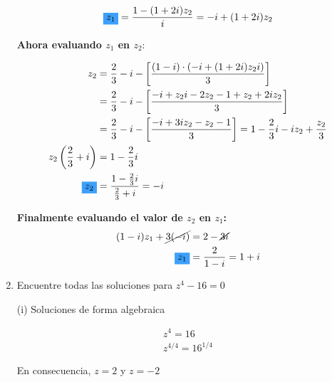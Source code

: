 \documentclass[a4paper,12pt]{article}
\begin{document}
\begin{enumerate}
            \begin{equation*}
                \colorbox{blueMacc}{$z_{1}$}=\frac{1-(1+2 i) z_{2}}{i}=-i+(1+2 i) z_{2}
            \end{equation*}

            \begin{center}
                \textbf{Ahora evaluando $z_{1}$ en $z_{2}$}:             
            \end{center}

            \begin{align*}
                z_{2} &=\frac{2}{3}-i-\left[\frac{(1-i) \cdot\left(-i+(1+2 i) z_{2} i\right)}{3}\right] \\
                &=\frac{2}{3}-i-\left[\frac{-i+z_{2} i-2 z_{2}-1+z_{2}+2 i z_{2}}{3}\right] \\
                &=\frac{2}{3}-i-\left[\frac{-i+3 i z_{2}-z_{2}-1}{3}\right]=1-\frac{2}{3} i-i z_{2}+\frac{z_{2}}{3}\\
                z_{2}\left(\frac{2}{3}+i\right) &=1-\frac{2}{3} i \\
                \colorbox{blueMacc}{$z_{2}$} &=\frac{1-\frac{2}{3} i}{\frac{2}{3}+i}= -i
            \end{align*}
            
            \begin{center}
                \textbf{Finalmente evaluando el valor de $z_{2}$ en $z_{1}$:}
                \begin{align*}
                    (1 - i)z_{1} + \cancel{3(-i)} &= 2 - \cancel{3i}\\
                    \colorbox{blueMacc}{$z_{1}$} &= \frac{2}{1 - i} = 1 + i\\
                \end{align*}
            \end{center}
            
        \item Encuentre todas las soluciones para $z^{4} - 16 = 0$
        
              (i) Soluciones de forma algebraica
              
            \begin{align*}
                z^{4} = 16\\
                z^{4/4} = 16^{1/4}
            \end{align*}
            
            En consecuencia, $z=2$ y $z=-2$
            

\end{enumerate}
\end{document}
